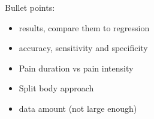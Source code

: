 Bullet points: 

\begin{itemize}
\item results, compare them to regression
\item accuracy, sensitivity and specificity
\item Pain duration vs pain intensity
\item Split body approach
\item data amount (not large enough)
\end{itemize}